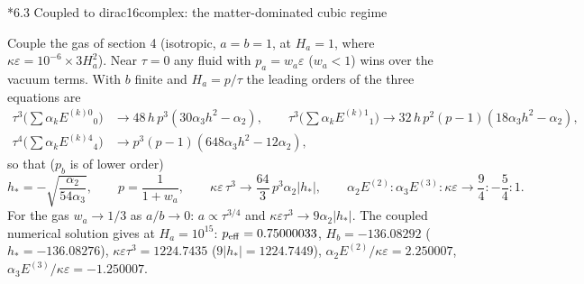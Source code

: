 \documentclass[10pt,a4paper]{article}
\makeatletter
\renewcommand\subsection{\@startsection{subsection}{2}{\z@}{-3.25ex\@plus -1ex \@minus -.2ex}{1.5ex \@plus .2ex}{\normalfont\large\bfseries\raggedright}}
\makeatother
\begin{document}
\subsection*{6.3 Coupled to dirac16complex: the matter-dominated cubic regime}
Couple the gas of section 4 (isotropic, $a=b=1$, at $H_a=1$, where $\kappa\varepsilon=10^{-6}\times3H_a^2$). Near $\tau=0$ any fluid with $p_a=w_a\varepsilon$ ($w_a<1$) wins over the vacuum terms. With $b$ finite and $H_a=p/\tau$ the leading orders of the three equations are
\begin{align*}
\tau^3\big(\textstyle\sum\alpha_kE^{(k)0}{}_0\big)&\to48\,h\,p^3(30\alpha_3h^2-\alpha_2),\qquad \tau^3\big(\textstyle\sum\alpha_kE^{(k)1}{}_1\big)\to32\,h\,p^2(p-1)(18\alpha_3h^2-\alpha_2), \\
\tau^4\big(\textstyle\sum\alpha_kE^{(k)4}{}_4\big)&\to p^3(p-1)(648\alpha_3h^2-12\alpha_2),
\end{align*}
so that ($p_b$ is of lower order)
\begin{equation*}
h_*=-\sqrt{\frac{\alpha_2}{54\alpha_3}},\qquad p=\frac1{1+w_a},\qquad \kappa\varepsilon\,\tau^3\to\frac{64}3\,p^3\alpha_2|h_*|,\qquad \alpha_2E^{(2)}:\alpha_3E^{(3)}:\kappa\varepsilon\to\frac94:-\frac54:1 .
\end{equation*}
For the gas $w_a\to1/3$ as $a/b\to0$: $a\propto\tau^{3/4}$ and $\kappa\varepsilon\tau^3\to9\alpha_2|h_*|$. The coupled numerical solution gives at $H_a=10^{15}$: $p_{\rm eff}=0.75000033$, $H_b=-136.08292$ ($h_*=-136.08276$), $\kappa\varepsilon\tau^3=1224.7435$ ($9|h_*|=1224.7449$), $\alpha_2E^{(2)}/\kappa\varepsilon=2.250007$, $\alpha_3E^{(3)}/\kappa\varepsilon=-1.250007$.
\end{document}
